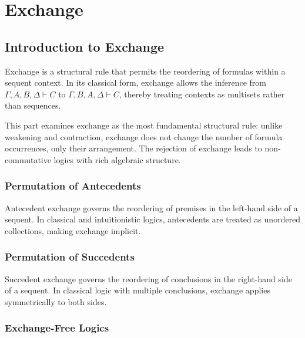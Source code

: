 

\part{Exchange}

\chapter*{Introduction to Exchange}
\label{sec-exchange-intro}
{}

Exchange is a structural rule that permits the reordering of formulas within a sequent context. In its classical form, exchange allows the inference from $\Gamma, A, B, \Delta \vdash C$ to $\Gamma, B, A, \Delta \vdash C$, thereby treating contexts as multisets rather than sequences.

This part examines exchange as the most fundamental structural rule: unlike weakening and contraction, exchange does not change the number of formula occurrences, only their arrangement. The rejection of exchange leads to non-commutative logics with rich algebraic structure.

\section*{Permutation of Antecedents}
\label{sec-exchange-antecedent}

Antecedent exchange governs the reordering of premises in the left-hand side of a sequent. In classical and intuitionistic logics, antecedents are treated as unordered collections, making exchange implicit.

\section*{Permutation of Succedents}
\label{sec-exchange-succedent}

Succedent exchange governs the reordering of conclusions in the right-hand side of a sequent. In classical logic with multiple conclusions, exchange applies symmetrically to both sides.

\section*{Exchange-Free Logics}
\label{sec-exchange-free}

